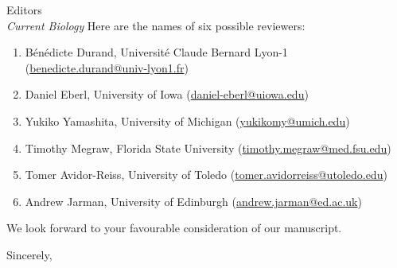 \documentclass[12pt, twoside, letterpaper]{letter}
\begin{document}
\begin{letter}{Editors \\
    \textit{Current Biology}}
Here are the names of six possible reviewers:
\begin{enumerate}
  \item B{\'e}n{\'e}dicte Durand, Université Claude Bernard Lyon-1 (\url{benedicte.durand@univ-lyon1.fr})
  \item Daniel Eberl, University of Iowa (\url{daniel-eberl@uiowa.edu})
  \item Yukiko Yamashita, University of Michigan (\url{yukikomy@umich.edu})
  \item Timothy Megraw, Florida State University (\url{timothy.megraw@med.fsu.edu})
  \item Tomer Avidor-Reiss, University of Toledo (\url{tomer.avidorreiss@utoledo.edu})
    \item Andrew Jarman, University of Edinburgh (\url{andrew.jarman@ed.ac.uk})
\end{enumerate}

We look forward to your favourable consideration of our manuscript.

\closing{Sincerely,}


\end{letter}
\end{document}
